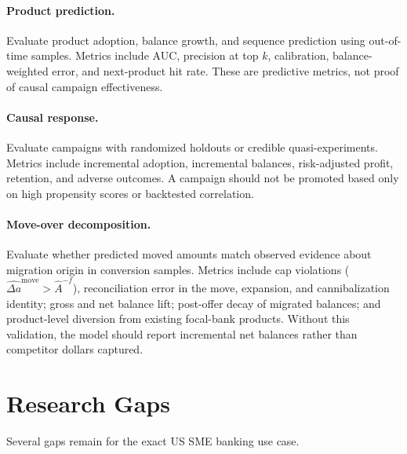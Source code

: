 \documentclass[11pt]{article}
\begin{document}
\paragraph{Product prediction.}
Evaluate product adoption, balance growth, and sequence prediction using
out-of-time samples. Metrics include AUC, precision at top $k$, calibration,
balance-weighted error, and next-product hit rate. These are predictive metrics,
not proof of causal campaign effectiveness.

\paragraph{Causal response.}
Evaluate campaigns with randomized holdouts or credible quasi-experiments.
Metrics include incremental adoption, incremental balances, risk-adjusted
profit, retention, and adverse outcomes. A campaign should not be promoted based
only on high propensity scores or backtested correlation.

\paragraph{Move-over decomposition.}
Evaluate whether predicted moved amounts match observed evidence about migration
origin in conversion samples. Metrics include cap violations
($\widehat{\Delta a}^{\mathrm{move}}>\widehat{A}^{-f}$), reconciliation error in
the move, expansion, and cannibalization identity; gross and net balance lift;
post-offer decay of migrated balances; and product-level diversion from existing
focal-bank products. Without this validation, the model should report
incremental net balances rather than competitor dollars captured.

\section{Research Gaps}

Several gaps remain for the exact US SME banking use case.
\end{document}
